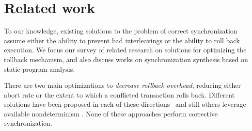\section{Related work}
To our knowledge, existing solutions to the problem of correct synchronization assume either the ability to prevent bad interleavings or the ability to roll back execution. We focus our survey of related research on solutions for optimizing the rollback mechanism, and also discuss works on synchronization synthesis based on static program analysis.

There are two main optimizations to \emph{decrease rollback overhead},
reducing either abort rate or the extent to which a conflicted
transaction rolls back. Different solutions have been proposed in
each of these directions~\cite{ppopp/HerlihyK08,Galois,TYFS:OOPSLA11}
and still others leverage available nondeterminism
\cite{TKS:OOPSLA13}. None of these approaches perform corrective
synchronization.
%
%
%
%
%
